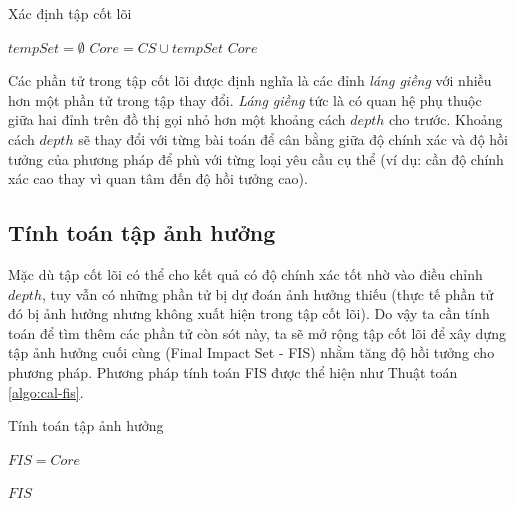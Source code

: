 \documentclass[12pt]{report}
\newenvironment{thuattoan}[1][h]
  {\renewcommand{\algorithmcfname}{Thuật toán}
   \begin{algorithm}[#1]
  }{\end{algorithm}}
\begin{document}
\begin{thuattoan}
	\label{algo:cal-core-set}
	\caption{Xác định tập cốt lõi}
	
	$tempSet = \emptyset$\;
	$Core = CS \cup tempSet$\;
	\Return $Core$\;
\end{thuattoan}

Các phần tử trong tập cốt lõi được định nghĩa là các đỉnh \textit{láng giềng} với nhiều hơn một phần tử trong tập thay đổi. \textit{Láng giềng} tức là có quan hệ phụ thuộc giữa hai đỉnh trên đồ thị gọi nhỏ hơn một khoảng cách $depth$ cho trước. Khoảng cách $depth$ sẽ thay đổi với từng bài toán để cân bằng giữa độ chính xác và độ hồi tưởng của phương pháp để phù với từng loại yêu cầu cụ thể (ví dụ: cần độ chính xác cao thay vì quan tâm đến độ hồi tưởng cao).

\subsection{Tính toán tập ảnh hưởng}
Mặc dù tập cốt lõi có thể cho kết quả có độ chính xác tốt nhờ vào điều chỉnh $depth$, tuy vẫn có những phần tử bị dự đoán ảnh hưởng thiếu (thực tế phần tử đó bị ảnh hưởng nhưng không xuất hiện trong tập cốt lõi). Do vậy ta cần tính toán để tìm thêm các phần tử còn sót này, ta sẽ mở rộng tập cốt lõi để xây dựng tập ảnh hưởng cuối cùng (Final Impact Set - FIS) nhằm tăng độ hồi tưởng cho phương pháp. Phương pháp tính toán FIS được thể hiện như Thuật toán \ref{algo:cal-fis}.

\begin{thuattoan}
	\label{algo:cal-fis}
	\caption{Tính toán tập ảnh hưởng}
	
	
	$FIS = Core$\;
	 {
	}
	
	\Return $FIS$\;
\end{thuattoan}
\end{document}
